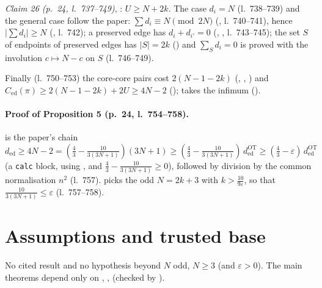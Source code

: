 \emph{Claim 26 (p.~24, l.~737--749)}, : $U\ge N+2k$. The case $d_i=N$ (l.~738--739) and the
general case follow the paper: $\sum d_i\equiv N\pmod{2N}$ (, l.~740--741), hence $|\sum d_i|\ge N$
(, l.~742); a preserved edge has $d_i+d_{i'}=0$ (, ,
l.~743--745); the set $S$ of endpoints of preserved edges has $|S|=2k$ () and
$\sum_{S}d_i=0$ is proved with the involution $c\mapsto N-c$ on $S$ (l.~746--749).

Finally (l.~750--753) the core-core pairs cost $2(N-1-2k)$ (, ,
) and $C_{\mathrm{ed}}(\pi)\ge2(N-1-2k)+2U\ge4N-2$ ();
 takes the infimum ().

\paragraph{Proof of Proposition 5 (p.~24, l.~754--758).}  is the paper's chain
$d_{\mathrm{ed}}\ge4N-2=(\frac43-\frac{10}{3(3N+1)})(3N+1)\ge(\frac43-\frac{10}{3(3N+1)})\,d^{\mathrm{OT}}_{\mathrm{ed}}
\ge(\frac43-\varepsilon)\,d^{\mathrm{OT}}_{\mathrm{ed}}$ (a \texttt{calc} block, using , 
and $\frac43-\frac{10}{3(3N+1)}\ge0$), followed by division by the common normalisation $n^2$ (l.~757).
 picks the odd $N=2k+3$ with $k>\frac{10}{9\varepsilon}$, so that
$\frac{10}{3(3N+1)}\le\varepsilon$ (l.~757--758).

\section{Assumptions and trusted base}
No cited result and no hypothesis beyond $N$ odd, $N\ge3$ (and $\varepsilon>0$). The main theorems depend only
on , ,  (checked by ).

